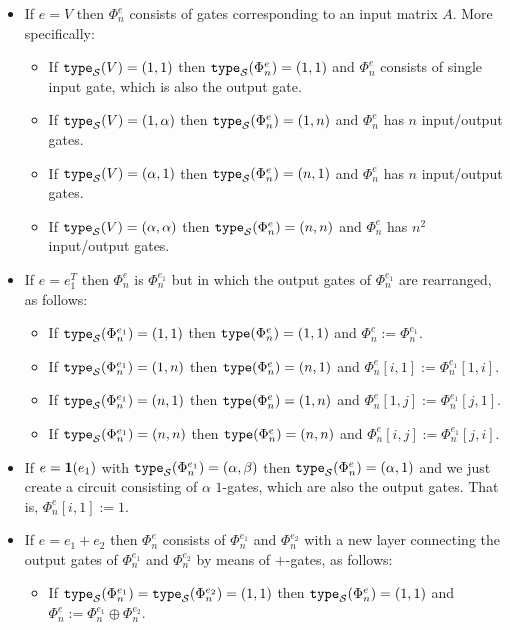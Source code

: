 \begin{itemize}
	\item
	If $e=V$ then $\Phi_n^e$ consists of gates corresponding to an input matrix $A$. More specifically:
\begin{itemize}
	\item If $\texttt{type}_{\mathcal{S}}(V)=(1,1)$ then $\texttt{type}_{\mathcal{S}}(\Phi^e_n)=(1,1)$ and $\Phi_n^e$ consists of single input gate, which is also
	the output gate.
	\item If $\texttt{type}_{\mathcal{S}}(V)=(1,\alpha)$ then $\texttt{type}_{\mathcal{S}}(\Phi^e_n)=(1,n)$ and $\Phi^e_n$ has $n$ input/output gates.
  \item If $\texttt{type}_{\mathcal{S}}(V)=(\alpha,1)$ then $\texttt{type}_{\mathcal{S}}(\Phi^e_n)=(n,1)$ and $\Phi^e_n$ has $n$ input/output gates.
	\item If $\texttt{type}_{\mathcal{S}}(V)=(\alpha,\alpha)$ then $\texttt{type}_{\mathcal{S}}(\Phi^e_n)=(n,n)$ and $\Phi^e_n$ has $n^2$ input/output gates. 
\end{itemize}
\item
If $e=e_1^T$ then $\Phi^e_n$ is $\Phi^{e_1}_n$ but in which the output gates of $\Phi_n^{e_1}$ are rearranged, as follows:
\begin{itemize}
	\item If $\texttt{type}_{\mathcal{S}}(\Phi^{e_1}_n)=(1, 1)$ then $\texttt{type}(\Phi^e_n)=(1,1)$ and $\Phi_n^e:=\Phi_n^{e_1}$.
	\item If $\texttt{type}_{\mathcal{S}}(\Phi^{e_1}_n)=(1, n)$ then $\texttt{type}(\Phi^e_n)=(n,1)$ and $\Phi^e_n[i,1]:=\Phi^{e_1}_n[1,i]$. 
  \item If $\texttt{type}_{\mathcal{S}}(\Phi^{e_1}_n)=(n, 1)$ then $\texttt{type}(\Phi^e_n)=(1,n)$ and $\Phi^e_n[1,j]:=\Phi^{e_1}_n[j,1]$. 
  \item If $\texttt{type}_{\mathcal{S}}(\Phi^{e_1}_n)=(n, n)$ then $\texttt{type}(\Phi^e_n)=(n,n)$ and $\Phi^e_n[i,j]:=\Phi^{e_1}_n[j,i]$. 
\end{itemize}
\item
If $e={\mathbf{1}}(e_1)$ with $\texttt{type}_{\mathcal{S}}(\Phi^{e_1}_n)=(\alpha,\beta)$ then $\texttt{type}_{\mathcal{S}}(\Phi^{e}_n)=(\alpha,1)$ and we just
create a circuit consisting of $\alpha$ $1$-gates, which are also the output gates. That is,
$\Phi^e_n[i,1]:=1$.
\item
If $e=e_1 + e_2$ then $\Phi_n^e$ consists of $\Phi_n^{e_1}$ and $\Phi_n^{e_2}$ with a new layer connecting the output gates of $\Phi_n^{e_1}$ and $\Phi_n^{e_2}$ by means
of $+$-gates, as follows:
\begin{itemize}
	\item If $\texttt{type}_{\mathcal{S}}(\Phi^{e_1}_n)=\texttt{type}_{\mathcal{S}}(\Phi^{e_2}_n)=(1, 1)$  then $\texttt{type}_{\mathcal{S}}(\Phi^{e}_n)=(1, 1)$ and $\Phi^e_n:=\Phi^{e_1}_n \oplus \Phi^{e_2}_n$.

\end{itemize}
\end{itemize}
